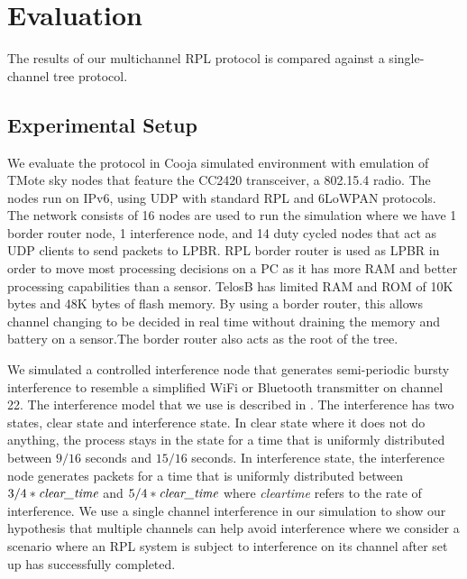 \section{Evaluation}
The results of our multichannel RPL protocol is compared against a single-channel tree protocol.

\subsection{Experimental Setup}
We evaluate the protocol in Cooja simulated environment with emulation of TMote sky nodes that feature the CC2420 transceiver, a 802.15.4 radio. The nodes run on IPv6, using UDP with standard RPL and 6LoWPAN protocols. The network consists of 16 nodes are used to run the simulation where we have 1 border router node, 1 interference node, and 14 duty cycled nodes that act as UDP clients to send packets to LPBR. RPL border router is used as LPBR in order to move most processing decisions on a PC as it has more RAM and better processing capabilities than a sensor. TelosB has limited RAM and ROM of 10K bytes and 48K bytes of flash memory. By using a border router, this allows channel changing to be decided in real time without draining the memory and battery on a sensor.The border router also acts as the root of the tree.

We simulated a controlled interference node that generates semi-periodic bursty interference to resemble a simplified WiFi or Bluetooth transmitter on channel 22. The interference model that we use is described in \cite{Boano:2010:MSM:2127940.2127963}. The interference has two states, clear state and interference state. In clear state where it does not do anything, the process stays in the state for a time that is uniformly distributed between $9/16$ seconds and $15/16$ seconds. In interference state, the interference node generates packets for a time that is uniformly distributed between $3/4 * \emph{clear\textunderscore time}$ and $5/4 * \emph{clear\textunderscore time}$ where \emph{clear\textunderscore time} refers to the rate of interference. We use a single channel interference in our simulation to show our hypothesis that multiple channels can help avoid interference where we consider a scenario where an RPL system is subject to interference on its channel after set up has successfully completed.



